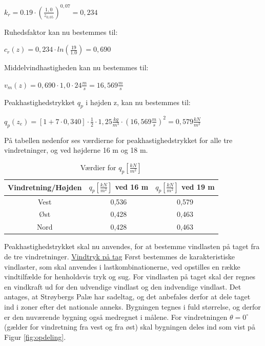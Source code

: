 \begin{center}
$k_r=0.19\cdot (\frac{1,\!0}{z_{0,\!05}})^{0,\!07}=0,\!234$
\end{center}
Ruhedsfaktor kan nu bestemmes til:
\begin{center}
$c_r(z)=0,\!234\cdot ln(\frac{19}{1.0})=0,\!690$
\end{center}
Middelvindhastigheden kan nu bestemmes til:
\begin{center}
$v_m(z)=0,\!690\cdot 1,\!0\cdot 24 \frac{m}{s}=16,\!569 \frac{m}{s}$
\end{center}
Peakhastighedstrykket $q_p$ i højden z, kan nu bestemmes til:
\begin{center}
$q_p(z_e)=[1+7\cdot 0,\!340]\cdot \frac{1}{2}\cdot 1,\!25 \frac{kg}{m^3}\cdot (16,\!569 \frac{m}{s})^2=0,\!579 \frac{kN}{m^2}$
\end{center}

På tabellen nedenfor ses værdierne for peakhastighedstrykket for alle tre vindretninger, og ved højderne 16 m og 18 m.
\begin{table}[htb]
\begin{center}
	\begin{tabular}{ |c|c|c| } 
		\hline
		Vindretning/Højden & $q_p [\frac{kN}{m^2}]$ ved 16 m & $q_p [\frac{kN}{m^2}]$ ved 19 m \\	\hline
		Vest & 0,536 & 0,579 \\		\hline
		Øst & 0,428 & 0,463 \\	\hline 
		Nord & 0,428 & 0,463 \\ 	\hline
	\end{tabular}
		\caption{Værdier for $q_p [\frac{kN}{m^2}]$}
		\label{tab:peak}
\end{center}
\end{table}

Peakhastighedstrykket skal nu anvendes, for at bestemme vindlasten på taget fra de tre vindretninger.
\newline
\newline
\underline{Vindtryk på tag}
\newline
Først bestemmes de karakteristiske vindlaster, som skal anvendes i lastkombinationerne, ved opstilles en række vindtilfælde for henholdsvis tryk og sug. 
\newline
\newline
For vindlasten på taget skal der regnes en vindkraft ud for den udvendige vindlast og den indvendige vindlast. Det antages, at Strøybergs Palæ har sadeltag, og det anbefales derfor at dele taget ind i zoner efter det nationale anneks. Bygningen tegnes i fuld størrelse, og derfor er den nuværende bygning også medregnet i målene. For vindretningen $\theta = 0^{\circ}$ (gælder for vindretning fra vest og fra øst) skal bygningen deles ind som vist på Figur \ref{fig:opdeling}.  


